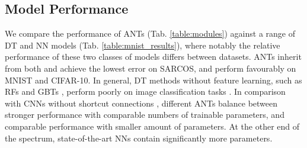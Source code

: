 
\subsection{Model Performance}
We compare the performance of ANTs (Tab. \ref{table:modules}) against a range of DT and NN models (Tab. \ref{table:mnist_results}), where notably the relative performance of these two classes of models differs between datasets. ANTs inherit from both and achieve the lowest error on SARCOS, and perform favourably on MNIST and CIFAR-10. In general, DT methods without feature learning, such as RFs \cite{breiman2001random,zhou2017deepft} and GBTs \cite{ponomareva2017compact}, perform poorly on image classification tasks \cite{krizhevsky2009learning}. In comparison with CNNs without shortcut connections \cite{lecun1998gradient,goodfellow2013maxout,lin2013network,springenberg2014striving}, different ANTs balance between stronger performance with comparable numbers of trainable parameters, and comparable performance with smaller amount of parameters. At the other end of the spectrum, state-of-the-art NNs \cite{sabour2017dynamic,huang2017densely} contain significantly more parameters.

